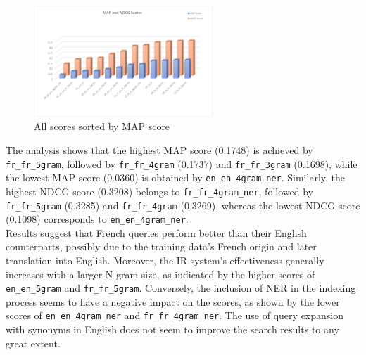 \begin{figure}[h!]
    \centering
    \includegraphics[width=0.6\textwidth]{figure/allScores.png}
    \caption{All scores sorted by MAP score}
    \label{fig:sorted_scores}
\end{figure}
The analysis shows that the highest MAP score (0.1748) is achieved by \texttt{fr\_fr\_5gram}, followed by \texttt{fr\_fr\_4gram} (0.1737) and \texttt{fr\_fr\_3gram} (0.1698), while the lowest MAP score (0.0360) is obtained by \texttt{en\_en\_4gram\_ner}.
Similarly, the highest NDCG score (0.3208) belongs to \texttt{fr\_fr\_4gram\_ner}, followed by \texttt{fr\_fr\_5gram} (0.3285) and \texttt{fr\_fr\_4gram} (0.3269), whereas the lowest NDCG score (0.1098) corresponds to \texttt{en\_en\_4gram\_ner}.\\
Results suggest that French queries perform better than their English counterparts, possibly due to the training data's French origin and later translation into English. Moreover, the IR system's effectiveness generally increases with a larger N-gram size, as indicated by the higher scores
of \texttt{en\_en\_5gram} and \texttt{fr\_fr\_5gram}. Conversely, the inclusion of NER in the indexing process seems to have a negative impact on the scores, as shown by the lower scores of \texttt{en\_en\_4gram\_ner} and \texttt{fr\_fr\_4gram\_ner}.
The use of query expansion with synonyms in English does not seem to improve the search results to any great extent.\\

